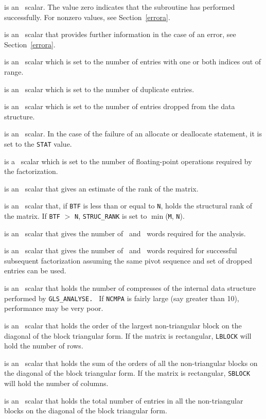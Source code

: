 \documentclass{galahad}
\newcommand{\packagename}{GLS}
\begin{document}
\begin{description}

 is an \integer\ scalar. The value
 zero indicates that the subroutine has performed
 successfully.  For nonzero values, see Section~\ref{errora}.

 is an \integer\ scalar that provides further information in the
case of an error, see Section~\ref{errora}.

 is an \integer\ scalar which is set to the number of
entries with one or both indices out of range.

 is an \integer\ scalar which is set to the number of
duplicate entries.

 is an \integer\ scalar which is set to the number of
entries dropped from the data structure.

 is an \integer\ scalar. In the case of the failure of an
allocate or deallocate statement, it is set to the {\tt STAT} value.

 is a \realdp\  scalar which is set to the number of
 floating-point operations required by the factorization.

 is an \integer\ scalar that gives an estimate of the rank of the
matrix.

 is an \integer\ scalar that, if {\tt BTF} is less
than or equal to {\tt N}, holds the
structural rank of the matrix. If {\tt BTF} $>$ {\tt N},
{\tt STRUC\_RANK} is set to $\min$({\tt M}, {\tt N}).

 is an \integer\ scalar that gives the number
 of \realdp\  and \integer\ words required for the analysis.

 is an \integer\ scalar that gives the number
 of \realdp\  and \integer\ words required for successful
 subsequent factorization assuming the same pivot sequence and set of
 dropped entries can be used.

 is an \integer\ scalar that holds the number of compresses
 of the internal data structure performed by {\tt \packagename\_ANALYSE.
} If {\tt NCMPA} is fairly large (say greater than 10), performance may be
 very poor.

 is an \integer\ scalar that holds the order of the largest
non-triangular block on the diagonal of the block triangular form.
If the matrix is rectangular, {\tt LBLOCK} will hold the number of rows.

 is an \integer\ scalar that holds the sum of the orders of all the
non-triangular blocks on the diagonal of the block triangular form.
If the matrix is rectangular, {\tt SBLOCK} will hold the number of columns.

 is an \integer\ scalar that holds the total number of entries in all
the non-triangular blocks on the diagonal of the block triangular form.

\end{description}
\end{document}
